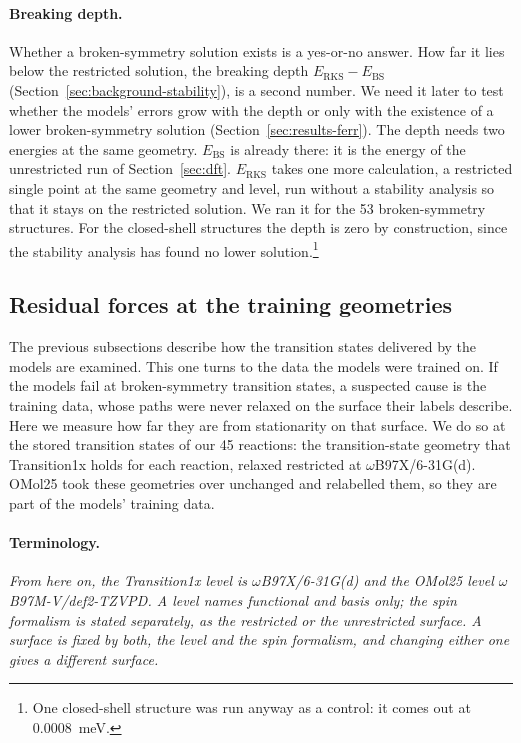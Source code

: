 \paragraph{Breaking depth.} Whether a broken-symmetry solution exists
is a yes-or-no answer. How far it lies below the restricted solution,
the breaking depth $E_\mathrm{RKS} - E_\mathrm{BS}$
(Section~\ref{sec:background-stability}), is a second number. We
need it later to test whether the models' errors grow with the depth
or only with the existence of a lower broken-symmetry solution
(Section~\ref{sec:results-ferr}). The depth needs two energies at the
same geometry. $E_\mathrm{BS}$ is already there: it is the energy of
the unrestricted run of Section~\ref{sec:dft}. $E_\mathrm{RKS}$ takes
one more calculation, a restricted single point at the same geometry
and level, run without a stability analysis so that it stays on the
restricted solution. We ran it for the 53 broken-symmetry structures. For
the closed-shell structures the depth is zero by construction, since
the stability analysis has found no lower
solution.\footnote{One closed-shell structure was run anyway as a
control: it comes out at $0.0008$~meV.}

\subsection{Residual forces at the training geometries}
\label{sec:labels}

The previous subsections describe how the transition states delivered
by the models are examined. This one turns to the data the models were
trained on. If the models fail at broken-symmetry transition states, a
suspected cause is the training data, whose paths were never relaxed on
the surface their labels describe. Here we measure how far they are
from stationarity on that surface. We do so at the stored transition
states of our 45 reactions: the transition-state geometry that
Transition1x holds for each reaction, relaxed restricted at
\mbox{$\omega$B97X/6-31G(d)}. OMol25 took these geometries over
unchanged and relabelled them, so they are part of the models' training
data.

\paragraph{Terminology.} \emph{From here on, the Transition1x level is
\mbox{$\omega$B97X/6-31G(d)} and the OMol25 level
\mbox{$\omega$B97M-V/def2-TZVPD}. A level names
functional and basis only; the spin formalism is stated separately, as
the restricted or the unrestricted surface. A surface is fixed by both,
the level and the spin formalism, and changing either one gives a
different surface.}

